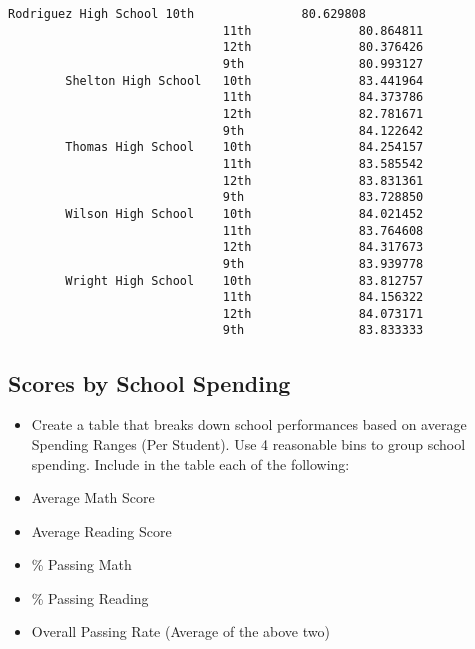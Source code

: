 \documentclass[11pt]{article}
\providecommand{\tightlist}{%
      \setlength{\itemsep}{0pt}\setlength{\parskip}{0pt}}
\begin{document}
\begin{Verbatim}[commandchars=\\\{\}]
        Rodriguez High School 10th               80.629808
                              11th               80.864811
                              12th               80.376426
                              9th                80.993127
        Shelton High School   10th               83.441964
                              11th               84.373786
                              12th               82.781671
                              9th                84.122642
        Thomas High School    10th               84.254157
                              11th               83.585542
                              12th               83.831361
                              9th                83.728850
        Wilson High School    10th               84.021452
                              11th               83.764608
                              12th               84.317673
                              9th                83.939778
        Wright High School    10th               83.812757
                              11th               84.156322
                              12th               84.073171
                              9th                83.833333
\end{Verbatim}
            
    \subsection{Scores by School Spending}\label{scores-by-school-spending}

    \begin{itemize}
\tightlist
\item
  Create a table that breaks down school performances based on average
  Spending Ranges (Per Student). Use 4 reasonable bins to group school
  spending. Include in the table each of the following:
\item
  Average Math Score
\item
  Average Reading Score
\item
  \% Passing Math
\item
  \% Passing Reading
\item
  Overall Passing Rate (Average of the above two)
\end{itemize}
\end{document}
